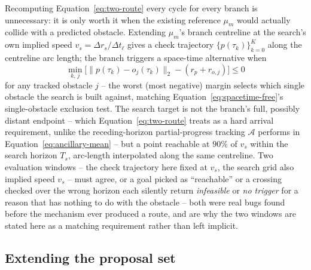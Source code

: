 \documentclass[11pt,a4paper]{article}
\begin{document}
Recomputing Equation~\eqref{eq:two-route} every cycle for every branch is
unnecessary: it is only worth it when the existing reference $\mu_m$ would
actually collide with a predicted obstacle. Extending $\mu_m$'s branch
centreline at the search's own implied speed $v_s=\Delta r_s/\Delta t_\ell$
gives a check trajectory $\{p(\tau_k)\}_{k=0}^{K}$ along the centreline arc
length; the branch triggers a space-time alternative when
\begin{equation}
  \min_{k,\,j}\bigl[
    \lVert p(\tau_k)-\hat o_j(\tau_k)\rVert_2-(r_p+r_{o,j})
  \bigr]\le0
  \label{eq:spacetime-trigger}
\end{equation}
for any tracked obstacle $j$ -- the worst (most negative) margin selects
which single obstacle the search is built against, matching
Equation~\eqref{eq:spacetime-free}'s single-obstacle exclusion test. The search
target is not the branch's full, possibly distant endpoint -- which
Equation~\eqref{eq:two-route} treats as a hard arrival requirement, unlike the
receding-horizon partial-progress tracking $\mathcal A$ performs in
Equation~\eqref{eq:ancillary-mean} -- but a point reachable at $90\%$ of $v_s$
within the search horizon $T_s$, arc-length interpolated along the same
centreline. Two evaluation windows -- the check trajectory here fixed at
$v_s$, the search grid also implied speed $v_s$ -- must agree, or a goal
picked as ``reachable'' or a crossing checked over the wrong horizon each
silently return \emph{infeasible} or \emph{no trigger} for a reason that has
nothing to do with the obstacle -- both were real bugs found before the
mechanism ever produced a route, and are why the two windows are stated
here as a matching requirement rather than left implicit.

\subsection{Extending the proposal set}
\end{document}
